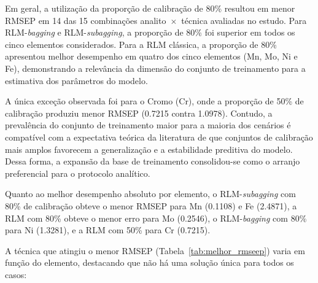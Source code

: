 Em geral, a utilização da proporção de calibração de 80\% resultou em menor RMSEP em 14 das 15 combinações analito~$\times$~técnica avaliadas no estudo. Para RLM-\textit{bagging} e RLM-\textit{subagging}, a proporção de 80\% foi superior em todos os cinco elementos considerados. Para a RLM clássica, a proporção de 80\% apresentou melhor desempenho em quatro dos cinco elementos (Mn, Mo, Ni e Fe), demonstrando a relevância da dimensão do conjunto de treinamento para a estimativa dos parâmetros do modelo.

A única exceção observada foi para o Cromo (Cr), onde a proporção de 50\% de calibração produziu menor RMSEP (\num{0,7215} contra \num{1,0978}). Contudo, a prevalência do conjunto de treinamento maior para a maioria dos cenários é compatível com a expectativa teórica da literatura de que conjuntos de calibração mais amplos favorecem a generalização e a estabilidade preditiva do modelo. Dessa forma, a expansão da base de treinamento consolidou-se como o arranjo preferencial para o protocolo analítico.

Quanto ao melhor desempenho absoluto por elemento, o RLM-\textit{subagging} com 80\% de calibração obteve o menor RMSEP para Mn (\num{0,1108}) e Fe (\num{2,4871}), a RLM com 80\% obteve o menor erro para Mo (\num{0,2546}), o RLM-\textit{bagging} com 80\% para Ni (\num{1,3281}), e a RLM com 50\% para Cr (\num{0,7215}).


A técnica que atingiu o menor RMSEP (Tabela~\ref{tab:melhor_rmseep}) varia em função do elemento, destacando que não há uma solução única para todos os casos:

